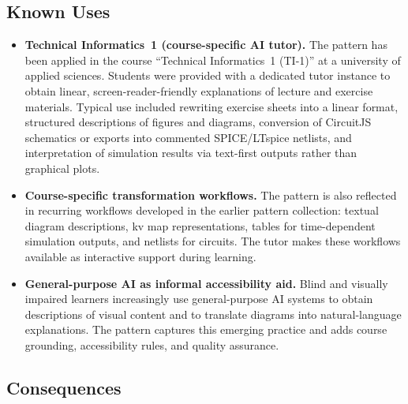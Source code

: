 \subsection*{Known Uses}

\begin{itemize}
    \item \textbf{Technical Informatics~1 (course-specific AI tutor).}
    The pattern has been applied in the course ``Technical Informatics~1 (TI-1)'' at a university of applied sciences. Students were provided with a dedicated tutor instance to obtain linear, screen-reader-friendly explanations of lecture and exercise materials. Typical use included rewriting exercise sheets into a linear format, structured descriptions of figures and diagrams, conversion of CircuitJS schematics or exports into commented SPICE/LTspice netlists, and interpretation of simulation results via text-first outputs rather than graphical plots.

    \item \textbf{Course-specific transformation workflows.}
    The pattern is also reflected in recurring workflows developed in the earlier pattern collection: textual diagram descriptions, \ac{kv} map representations, tables for time-dependent simulation outputs, and netlists for circuits. The tutor makes these workflows available as interactive support during learning.

    \item \textbf{General-purpose AI as informal accessibility aid.}
    Blind and visually impaired learners increasingly use general-purpose AI systems to obtain descriptions of visual content and to translate diagrams into natural-language explanations. The pattern captures this emerging practice and adds course grounding, accessibility rules, and quality assurance.
\end{itemize}

\subsection*{Consequences}

